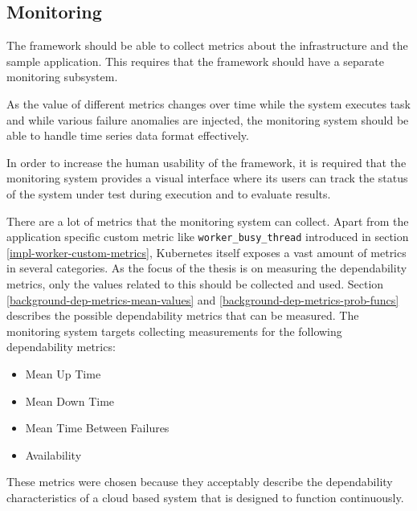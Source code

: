 \subsection{Monitoring}

The framework should be able to collect metrics about the infrastructure and the sample application. This requires that the framework should have a separate monitoring subsystem.

As the value of different metrics changes over time while the system executes task and while various failure anomalies are injected, the monitoring system should be able to handle time series data format effectively.

In order to increase the human usability of the framework, it is required that the monitoring system provides a visual interface where its users can track the status of the system under test during execution and to evaluate results.

There are a lot of metrics that the monitoring system can collect. Apart from the application specific custom metric like \texttt{worker\_busy\_thread} introduced in section \ref{impl-worker-custom-metrics}, Kubernetes itself exposes a vast amount of metrics in several categories. As the focus of the thesis is on measuring the dependability metrics, only the values related to this should be collected and used. Section \ref{background-dep-metrics-mean-values} and \ref{background-dep-metrics-prob-funcs} describes the possible dependability metrics that can be measured. The monitoring system targets collecting measurements for the following dependability metrics:

\begin{itemize}
	\item Mean Up Time
	\item Mean Down Time
	\item Mean Time Between Failures
	\item Availability
\end{itemize}

These metrics were chosen because they acceptably describe the dependability characteristics of a cloud based system that is designed to function continuously. 

